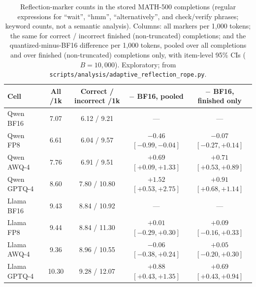 \documentclass[11pt,a4paper]{article}
\begin{document}
\begin{table}[t]
\centering
\caption{Reflection-marker counts in the stored MATH-500 completions (regular expressions for ``wait'', ``hmm'', ``alternatively'', and check/verify phrases; keyword counts, not a semantic analysis). Columns: all markers per 1{,}000 tokens; the same for correct / incorrect finished (non-truncated) completions; and the quantized-minus-BF16 difference per 1{,}000 tokens, pooled over all completions and over finished (non-truncated) completions only, with item-level 95\% CIs ($B=10{,}000$). Exploratory; from \texttt{scripts/analysis/adaptive\_reflection\_rope.py}.}
\label{tab:reflection}
\footnotesize
\setlength{\tabcolsep}{2.5pt}
\begin{tabular}{lcccc}
\toprule
\textbf{Cell} & \textbf{All /1k} & \textbf{Correct / incorrect /1k} & \textbf{$-$ BF16, pooled} & \textbf{$-$ BF16, finished only} \\
\midrule
Qwen BF16 & 7.07 & 6.12 / 9.21 & --- & --- \\
Qwen FP8 & 6.61 & 6.04 / 9.57 & $-0.46$ $[-0.99,-0.04]$ & $-0.07$ $[-0.27,+0.14]$ \\
Qwen AWQ-4 & 7.76 & 6.91 / 9.51 & $+0.69$ $[+0.09,+1.33]$ & $+0.71$ $[+0.53,+0.89]$ \\
Qwen GPTQ-4 & 8.60 & 7.80 / 10.80 & $+1.52$ $[+0.53,+2.75]$ & $+0.91$ $[+0.68,+1.14]$ \\
\midrule
Llama BF16 & 9.43 & 8.84 / 10.92 & --- & --- \\
Llama FP8 & 9.44 & 8.84 / 11.30 & $+0.01$ $[-0.29,+0.30]$ & $+0.09$ $[-0.16,+0.33]$ \\
Llama AWQ-4 & 9.36 & 8.96 / 10.55 & $-0.06$ $[-0.38,+0.24]$ & $+0.05$ $[-0.20,+0.30]$ \\
Llama GPTQ-4 & 10.30 & 9.28 / 12.07 & $+0.88$ $[+0.43,+1.35]$ & $+0.69$ $[+0.43,+0.94]$ \\
\bottomrule
\end{tabular}
\end{table}
\end{document}
